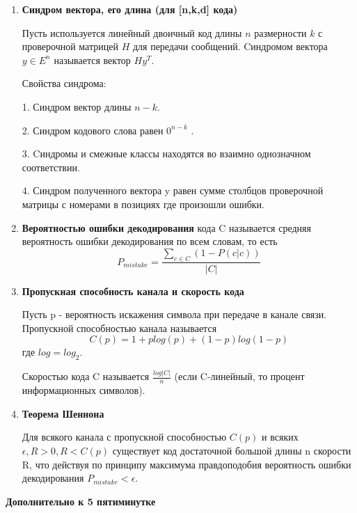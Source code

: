 \documentclass[a4paper, 12pt]{report}
\begin{document}
\begin{enumerate}

\item \textbf{Синдром вектора, его длина (для [n,k,d] кода)}

Пусть используется линейный двоичный код длины $n$ размерности $k$ с проверочной матрицей $H$ для передачи сообщений. Cиндромом вектора $y \in E^n$  называется вектор $H y^T$.

Свойства синдрома:


1. Синдром вектор длины $n - k$.

2. Синдром кодового слова равен $0^{n - k}$ .

3. Cиндромы и смежные классы находятся во взаимно однозначном соответствии.

4. Синдром полученного вектора y равен сумме столбцов проверочной матрицы с номерами в позициях где произошли ошибки.


\item \textbf{Вероятностью ошибки декодирования} кода C называется
средняя вероятность ошибки декодирования по всем словам, то
есть
\[ P_{mistake} = \frac{\sum_{c \in C} (1 - P(c|c)) }{|C|}  \]

\item \textbf{Пропускная способность канала и скорость кода}

Пусть p - вероятность искажения символа при передаче в канале
связи.
Пропускной способностью канала называется
\[C(p) = 1 + p log(p) + (1 - p) log(1 - p)\] где $log = log_2$.

Скоростью кода C называется $\frac{log |C|}{n}$
(если C-линейный, то процент информационных символов).


\item \textbf{Теорема Шеннона}

Для всякого канала с пропускной способностью $C(p)$ и всяких $\epsilon, R > 0, R < C(p)$ существует код достаточной большой длины n скорости R, что действуя по принципу максимума правдоподобия вероятность ошибки декодирования $P_{mistake} < \epsilon$.

\end{enumerate}


\textbf{Дополнительно к 5 пятиминутке}
\end{document}

